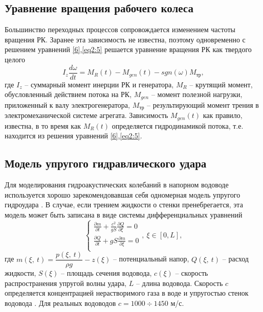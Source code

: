 \subsection{Уравнение вращения рабочего колеса}
Большинство переходных процессов сопровождается изменением частоты вращения РК. Заранее эта зависимость не 
известна, поэтому одновременно с решением уравнений \eqref{6},\eqref{eq2:5} решается уравнение вращения РК 
как твердого целого
\begin{equation}
  \label{eq2:6} 
  I_z \frac{{d\omega }}{{dt}} = M_R (t) - M_{gen} (t) - sgn(\omega) M_{\text{тр}},
\end{equation}
где $I_z$ -- суммарный момент инерции РК и генератора, $M_R$ -- крутящий момент, обусловленный действием 
потока на РК, $M_{gen}$ -- момент полезной нагрузки, приложенный к валу электрогенератора,
$M_{\text{тр}}$ -- результирующий момент трения в электромеханической системе агрегата. Зависимость 
$M_{gen}(t)$ как правило, известна, в то время как $M_R(t)$ определяется гидродинамикой потока, т.е. находится 
из решения уравнений \eqref{6},\eqref{eq2:5}.

\subsection{Модель упругого гидравлического удара}
Для моделирования гидроакустических колебаний в напорном водоводе используется хорошо зарекомендовавшая себя 
одномерная модель упругого гидроудара \cite{jukovskii,krivch}. В случае, если трением жидкости о стенки
пренебрегается, эта модель может быть записана в виде системы дифференциальных уравнений
\begin{equation}
  \label{eq2:7}
  \left\{ \begin{aligned}
  \frac{{\partial m}}{{\partial t}} + \frac{{c^2 }}{{gS}}\frac{{\partial Q}}{{\partial \xi}} = 0 \\
  \frac{{\partial Q}}{{\partial t}} + gS\frac{{\partial m}}{{\partial \xi}} = 0 \\
  \end{aligned} \right.,\
  \xi \in [0,L],
\end{equation}
где $m(\xi,\ t) = \dfrac{p(\xi,\ t)}{{\rho g}} - z(\xi)$ -- потенциальный напор, $Q(\xi,\ t)$ -- расход 
жидкости, $S(\xi)$ -- площадь сечения водовода, $c(\xi)$ -- скорость распространения упругой волны удара, 
$L$ -- длина водовода. Скорость $c$ определяется концентрацией нерастворимого газа в воде и упругостью
стенок водовода \cite{krivch}. Для реальных водоводов $c= 1000\div 1450$ м/с.

